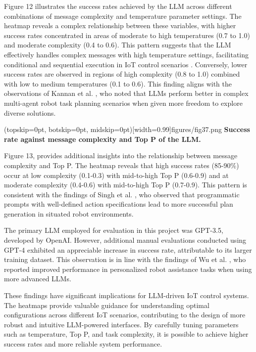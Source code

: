 \documentclass{ieeeaccess}
\begin{document}
Figure 12 illustrates the success rates achieved by the LLM across different combinations of message complexity and temperature parameter settings. The heatmap reveals a complex relationship between these variables, with higher success rates concentrated in areas of moderate to high temperatures (0.7 to 1.0) and moderate complexity (0.4 to 0.6). This pattern suggests that the LLM effectively handles complex messages with high temperature settings, facilitating conditional and sequential execution in IoT control scenarios \cite{10315791}. Conversely, lower success rates are observed in regions of high complexity (0.8 to 1.0) combined with low to medium temperatures (0.1 to 0.6). This finding aligns with the observations of Kannan et al. \cite{kannan2024smartllmsmartmultiagentrobot}, who noted that LLMs perform better in complex multi-agent robot task planning scenarios when given more freedom to explore diverse solutions.

\Figure[t!](topskip=0pt, botskip=0pt,
midskip=0pt)[width=0.99\columnwidth]{{figures/fig37.png}}
{ \textbf{Success rate against message complexity and Top P of the LLM.}\label{fig13}}

Figure 13, provides additional insights into the relationship between message complexity and Top P. The heatmap reveals that high success rates (85-90\%) occur at low complexity (0.1-0.3) with mid-to-high Top P (0.6-0.9) and at moderate complexity (0.4-0.6) with mid-to-high Top P (0.7-0.9). This pattern is consistent with the findings of Singh et al. \cite{Singh2023}, who observed that programmatic prompts with well-defined action specifications lead to more successful plan generation in situated robot environments.

The primary LLM employed for evaluation in this project was GPT-3.5, developed by OpenAI. However, additional manual evaluations conducted using GPT-4 exhibited an appreciable increase in success rate, attributable to its larger training dataset. This observation is in line with the findings of Wu et al. \cite{Wu2023}, who reported improved performance in personalized robot assistance tasks when using more advanced LLMs.

These findings have significant implications for LLM-driven IoT control systems. The heatmaps provide valuable guidance for understanding optimal configurations across different IoT scenarios, contributing to the design of more robust and intuitive LLM-powered interfaces. By carefully tuning parameters such as temperature, Top P, and task complexity, it is possible to achieve higher success rates and more reliable system performance.
\end{document}
